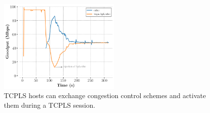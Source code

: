 \begin{figure}[!t]
  \begin{center}
    \includegraphics[width=6cm]{pretty_plotify/plots/vegas_cubic.png}
  \end{center}
  \caption{TCPLS hosts can exchange congestion control schemes and activate them during a TCPLS session.}
  \label{fig:vegasCubic}
\end{figure}
